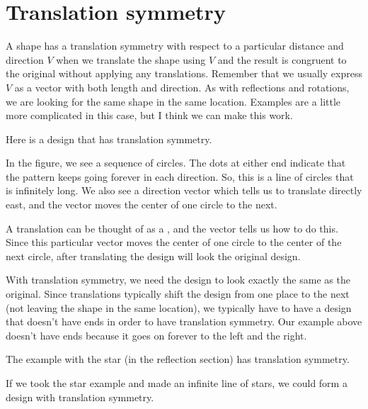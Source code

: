 \documentclass{ximera}
\begin{document}
\section{Translation symmetry}

A shape has a translation symmetry with respect to a particular distance and direction $V$ when we translate the shape using $V$ and the result is congruent to the original without applying any translations. Remember that we usually express $V$ as a vector with both length and direction. As with reflections and rotations, we are looking for the same shape in the same location. Examples are a little more complicated in this case, but I think we can make this work.

\begin{example}
Here is a design that has translation symmetry.
\begin{image}
\end{image}
In the figure, we see a sequence of circles. The dots at either end indicate that the pattern keeps going forever in each direction. So, this is a line of circles that is infinitely long. We also see a direction vector which tells us to translate directly east, and the vector moves the center of one circle to the next.

A translation can be thought of as a  , and the vector tells us how to do this. Since this particular vector moves the center of one circle to the center of the next circle, after translating the design will look  the original design.

\end{example}
With translation symmetry, we need the design to look exactly the same as the original. Since translations typically shift the design from one place to the next (not leaving the shape in the same location), we typically have to have a design that doesn't have ends in order to have translation symmetry. Our example above doesn't have ends because it goes on forever to the left and the right.

\begin{question}
The example with the star (in the reflection section) has translation symmetry.
\begin{multipleChoice}
\end{multipleChoice}

If we took the star example and made  an infinite line of stars, we could form a design with translation symmetry.
\begin{multipleChoice}
\end{multipleChoice}
\end{question}
\end{document}
